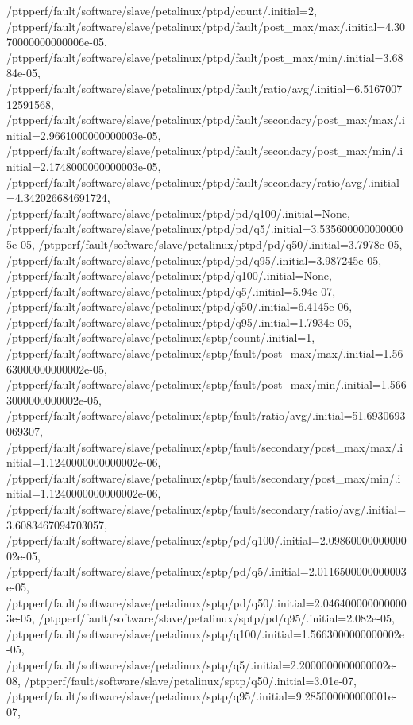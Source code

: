 {    /ptpperf/fault/software/slave/petalinux/ptpd/count/.initial=2,
    /ptpperf/fault/software/slave/petalinux/ptpd/fault/post_max/max/.initial=4.3070000000000006e-05,
    /ptpperf/fault/software/slave/petalinux/ptpd/fault/post_max/min/.initial=3.6884e-05,
    /ptpperf/fault/software/slave/petalinux/ptpd/fault/ratio/avg/.initial=6.516700712591568,
    /ptpperf/fault/software/slave/petalinux/ptpd/fault/secondary/post_max/max/.initial=2.9661000000000003e-05,
    /ptpperf/fault/software/slave/petalinux/ptpd/fault/secondary/post_max/min/.initial=2.1748000000000003e-05,
    /ptpperf/fault/software/slave/petalinux/ptpd/fault/secondary/ratio/avg/.initial=4.342026684691724,
    /ptpperf/fault/software/slave/petalinux/ptpd/pd/q100/.initial=None,
    /ptpperf/fault/software/slave/petalinux/ptpd/pd/q5/.initial=3.5356000000000005e-05,
    /ptpperf/fault/software/slave/petalinux/ptpd/pd/q50/.initial=3.7978e-05,
    /ptpperf/fault/software/slave/petalinux/ptpd/pd/q95/.initial=3.987245e-05,
    /ptpperf/fault/software/slave/petalinux/ptpd/q100/.initial=None,
    /ptpperf/fault/software/slave/petalinux/ptpd/q5/.initial=5.94e-07,
    /ptpperf/fault/software/slave/petalinux/ptpd/q50/.initial=6.4145e-06,
    /ptpperf/fault/software/slave/petalinux/ptpd/q95/.initial=1.7934e-05,
    /ptpperf/fault/software/slave/petalinux/sptp/count/.initial=1,
    /ptpperf/fault/software/slave/petalinux/sptp/fault/post_max/max/.initial=1.5663000000000002e-05,
    /ptpperf/fault/software/slave/petalinux/sptp/fault/post_max/min/.initial=1.5663000000000002e-05,
    /ptpperf/fault/software/slave/petalinux/sptp/fault/ratio/avg/.initial=51.6930693069307,
    /ptpperf/fault/software/slave/petalinux/sptp/fault/secondary/post_max/max/.initial=1.1240000000000002e-06,
    /ptpperf/fault/software/slave/petalinux/sptp/fault/secondary/post_max/min/.initial=1.1240000000000002e-06,
    /ptpperf/fault/software/slave/petalinux/sptp/fault/secondary/ratio/avg/.initial=3.6083467094703057,
    /ptpperf/fault/software/slave/petalinux/sptp/pd/q100/.initial=2.0986000000000002e-05,
    /ptpperf/fault/software/slave/petalinux/sptp/pd/q5/.initial=2.0116500000000003e-05,
    /ptpperf/fault/software/slave/petalinux/sptp/pd/q50/.initial=2.0464000000000003e-05,
    /ptpperf/fault/software/slave/petalinux/sptp/pd/q95/.initial=2.082e-05,
    /ptpperf/fault/software/slave/petalinux/sptp/q100/.initial=1.5663000000000002e-05,
    /ptpperf/fault/software/slave/petalinux/sptp/q5/.initial=2.2000000000000002e-08,
    /ptpperf/fault/software/slave/petalinux/sptp/q50/.initial=3.01e-07,
    /ptpperf/fault/software/slave/petalinux/sptp/q95/.initial=9.285000000000001e-07,
}
